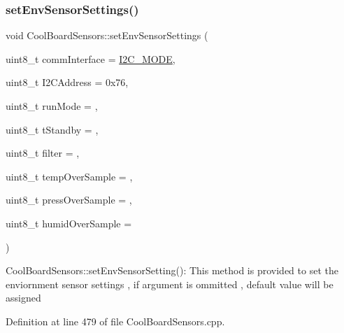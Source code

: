 \subsubsection{\texorpdfstring{set\+Env\+Sensor\+Settings()}{setEnvSensorSettings()}}
{\footnotesize\ttfamily void Cool\+Board\+Sensors\+::set\+Env\+Sensor\+Settings (\begin{DoxyParamCaption}\item[{uint8\+\_\+t}]{comm\+Interface = {\ttfamily \hyperlink{_cool_spark_fun_b_m_e280_8h_a5cd01756030509b764d43a2b8c94fce8}{I2\+C\+\_\+\+M\+O\+DE}},  }\item[{uint8\+\_\+t}]{I2\+C\+Address = {\ttfamily 0x76},  }\item[{uint8\+\_\+t}]{run\+Mode = {},  }\item[{uint8\+\_\+t}]{t\+Standby = {},  }\item[{uint8\+\_\+t}]{filter = {},  }\item[{uint8\+\_\+t}]{temp\+Over\+Sample = {},  }\item[{uint8\+\_\+t}]{press\+Over\+Sample = {},  }\item[{uint8\+\_\+t}]{humid\+Over\+Sample = {} }\end{DoxyParamCaption})}

Cool\+Board\+Sensors\+::set\+Env\+Sensor\+Setting()\+: This method is provided to set the enviornment sensor settings , if argument is ommitted , default value will be assigned 

Definition at line 479 of file Cool\+Board\+Sensors.\+cpp.



